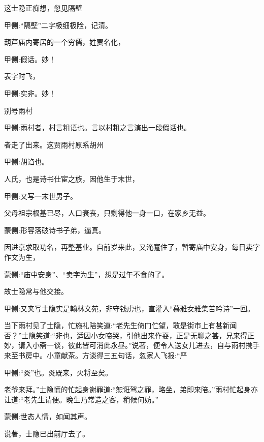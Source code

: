 \begin{parag}
    这士隐正痴想，忽见隔壁\begin{note}甲侧:“隔壁”二字极细极险，记清。\end{note}葫芦庙内寄居的一个穷儒，姓贾名化，\begin{note}甲侧:假话。妙！\end{note}表字时飞，\begin{note}甲侧:实非。妙！\end{note}别号雨村\begin{note}甲侧:雨村者，村言粗语也。言以村粗之言演出一段假话也。\end{note}者走了出来。这贾雨村原系胡州\begin{note}甲侧:胡诌也。\end{note}人氏，也是诗书仕宦之族，因他生于末世，\begin{note}甲侧:又写一末世男子。\end{note}父母祖宗根基已尽，人口衰丧，只剩得他一身一口，在家乡无益。\begin{note}蒙侧:形容落破诗书子弟，逼真。\end{note}因进京求取功名，再整基业。自前岁来此，又淹蹇住了，暂寄庙中安身，每日卖字作文为生，\begin{note}蒙侧:“庙中安身”、“卖字为生”，想是过午不食的了。\end{note}故士隐常与他交接。\begin{note}甲侧:又夹写士隐实是翰林文苑，非守钱虏也，直灌入“慕雅女雅集苦吟诗”一回。\end{note}当下雨村见了士隐，忙施礼陪笑道:“老先生倚门伫望，敢是街市上有甚新闻否？”士隐笑道:“非也，适因小女啼哭，引他出来作耍，正是无聊之甚，兄来得正妙，请入小斋一谈，彼此皆可消此永昼。”说著，便令人送女儿进去，自与雨村携手来至书房中。小童献茶。方谈得三五句话，忽家人飞报:“严\begin{note}甲侧:“炎”也。炎既来，火将至矣。\end{note}老爷来拜。”士隐慌的忙起身谢罪道:“恕诳驾之罪，略坐，弟即来陪。”雨村忙起身亦让道:“老先生请便。晚生乃常造之客，稍候何妨。”\begin{note}蒙侧:世态人情，如闻其声。\end{note}说著，士隐已出前厅去了。
\end{parag}



